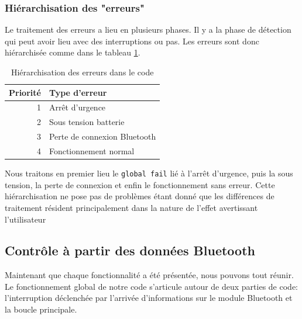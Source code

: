 				\subsubsection{Hiérarchisation des "erreurs"}
				Le traitement des erreurs a lieu en plusieurs phases. Il y a la phase de détection qui peut avoir lieu avec des interruptions ou pas. Les erreurs sont donc hiérarchisée comme dans le tableau \ref{hierar}.
				\begin{table}[hb]
				\begin{center}
					\begin{tabular}{r|l}
					Priorité&Type d'erreur\\
					\hline
					 1 & Arrêt d'urgence 	\\ 
					 2 & Sous tension batterie 	\\ 
					 3 & Perte de connexion Bluetooth	\\
					 4 & Fonctionnement normal	\\
					\end{tabular} 
					\caption{Hiérarchisation des erreurs dans le code}
					\label{hierar}
					\end{center}
				\end{table}
				Nous traitons en premier lieu le \texttt{global fail} lié à l'arrêt d'urgence, puis la sous tension, la perte de connexion et enfin le fonctionnement sans erreur. Cette hiérarchisation ne pose pas de problèmes étant donné que les différences de traitement résident principalement dans la nature de l'effet avertissant l'utilisateur
			\subsection{Contrôle à partir des données Bluetooth}
			Maintenant que chaque fonctionnalité a été présentée, nous pouvons tout réunir. Le fonctionnement global de notre code s'articule autour de deux parties de code: l'interruption déclenchée par l'arrivée d'informations sur le module Bluetooth et la boucle principale.
